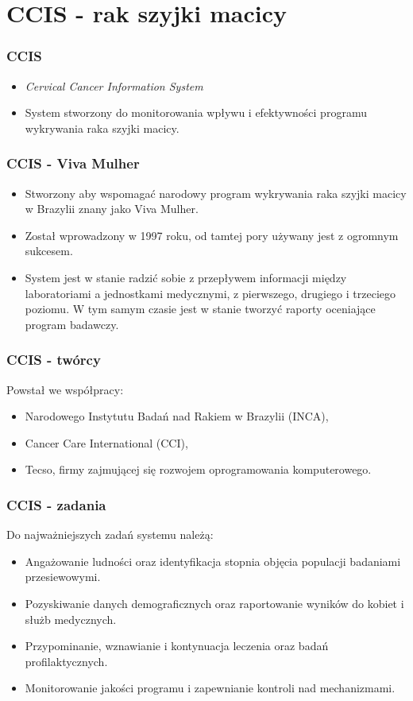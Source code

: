 \section{CCIS - rak szyjki macicy}

\begin{frame}
\frametitle{CCIS}

  \begin{itemize}
    \item \textit{Cervical Cancer Information System}
    \item System stworzony do monitorowania wpływu i efektywności programu wykrywania raka szyjki macicy.
  \end{itemize}

\end{frame}

\begin{frame}
\frametitle{CCIS - Viva Mulher}

  \begin{itemize}
    \item Stworzony aby wspomagać narodowy program wykrywania raka szyjki macicy w Brazylii znany jako Viva Mulher.
    \item Został wprowadzony w 1997 roku, od tamtej pory używany jest z ogromnym sukcesem.
    \item System jest w stanie radzić sobie z przepływem informacji między laboratoriami a jednostkami medycznymi, z pierwszego, drugiego i trzeciego poziomu. W tym samym czasie jest w stanie tworzyć raporty oceniające program badawczy.
  \end{itemize}

\end{frame}

\begin{frame}
\frametitle{CCIS - twórcy}

Powstał we współpracy:
  \begin{itemize}
    \item Narodowego Instytutu Badań nad Rakiem w Brazylii (INCA),
    \item Cancer Care International (CCI),
    \item Tecso, firmy zajmującej się rozwojem oprogramowania komputerowego.
  \end{itemize}

\end{frame}

\begin{frame}
\frametitle{CCIS - zadania}

Do najważniejszych zadań systemu należą:
  \begin{itemize}
  \item Angażowanie ludności oraz identyfikacja stopnia objęcia populacji badaniami przesiewowymi.
  \item Pozyskiwanie danych demograficznych oraz raportowanie wyników do kobiet i służb medycznych.
  \item Przypominanie, wznawianie i kontynuacja leczenia  oraz badań profilaktycznych.
  \item Monitorowanie jakości programu i zapewnianie kontroli nad mechanizmami.
  \end{itemize}
\end{frame}
